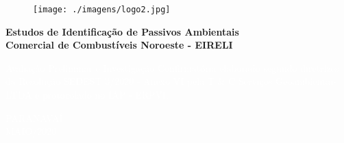 \thispagestyle{empty}
\begin{figure}[t]
\centering
\texttt{[image: ./imagens/logo2.jpg]}
\end{figure}
\mbox{}
 
\vspace{6.5cm}
\begin{center}
{\Large \bfseries
Estudos de Identificação de Passivos Ambientais\\ 
Comercial de Combustíveis Noroeste - EIRELI }
\end{center}

\vfill

\begin{flushright}
\begin{minipage}[h]{8cm}
{\footnotesize \textcolor{white}{Avaliação Preliminar e Investigação Confirmatória elaborado segundo diretrizes da Resolução SEDEST 3/2020 - Anexo VI pela T \& C Serviços Geoambientais LTDA e protocolado no IAP - ERPVI.}}
\end{minipage}
\end{flushright}

\vfill

\begin{center}
{\large \textcolor{white} {
{PARANAVAÍ\\
MAIO/2020}}
}
\end{center}
\newpage
\insertblankpage